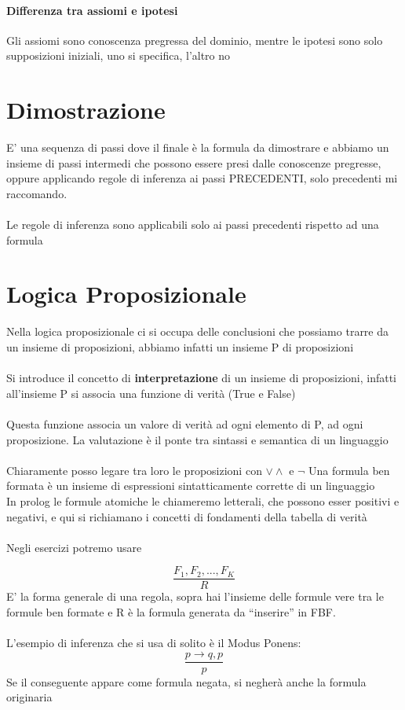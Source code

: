 \documentclass[12pt, a4paper, openany, oneside]{book}
\begin{document}
\paragraph{Differenza tra assiomi e ipotesi}
Gli assiomi sono conoscenza pregressa del dominio, mentre le ipotesi sono solo
supposizioni iniziali, uno si specifica, l'altro no
\section{Dimostrazione}
E' una sequenza di passi dove il finale è la formula da dimostrare e abbiamo
un insieme di passi intermedi che possono essere presi dalle conoscenze
 pregresse, oppure applicando regole di inferenza ai passi PRECEDENTI, solo
 precedenti mi raccomando.
 \\ \\
 Le regole di inferenza sono applicabili solo ai passi precedenti rispetto ad 
 una formula
 \section{Logica Proposizionale}
 Nella logica proposizionale ci si occupa delle conclusioni che possiamo 
 trarre da un insieme di proposizioni, abbiamo infatti un insieme P di 
 proposizioni \\ \\
 Si introduce il concetto di \textbf{interpretazione} di un insieme di 
 proposizioni, infatti all'insieme P si associa una funzione di verità (True e 
 False) \\ \\
 Questa funzione associa un valore di verità ad ogni elemento di P, ad ogni 
 proposizione. La valutazione è il ponte tra sintassi e semantica di un 
 linguaggio
\\ \\
Chiaramente posso legare tra loro le proposizioni con $\vee \wedge$ e $\neg$ 
Una formula ben formata è un insieme di espressioni sintatticamente corrette di
un linguaggio
\\
In prolog le formule atomiche le chiameremo letterali, che possono esser 
positivi e negativi, e qui si richiamano i concetti di fondamenti della tabella
di verità
\\ \\
Negli esercizi potremo usare 

$$
\frac{F_{1}, F_{2}, ... , F_{K}}{R}$$ 
E' la forma generale di una regola, sopra hai l'insieme delle formule vere tra le formule ben formate e R è la formula generata da “inserire” in FBF. \\ \\
L'esempio di inferenza che si usa di solito è il Modus Ponens: 
$$\frac{p \to q, p}{p} $$
Se il conseguente appare come formula negata, si negherà anche la formula originaria
\end{document}
